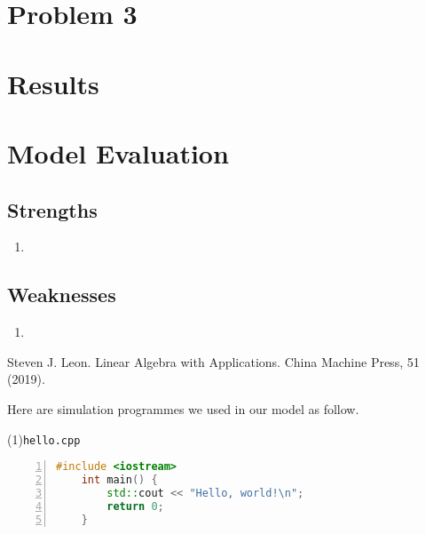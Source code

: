 \documentclass[UTF8]{mcmthesis}
\begin{document}
    \section{Problem 3}
    \section{Results}
    \section{Model Evaluation}
        \subsection{Strengths}
            \begin{enumerate}
                \item 
            \end{enumerate}
            
        \subsection{Weaknesses}
            \begin{enumerate}
                \item 
            \end{enumerate}


        \begin{thebibliography}{99}
            Steven J. Leon.
            Linear Algebra with Applications.
            China Machine Press, 51 (2019).
        \end{thebibliography}


    \begin{appendices}
        Here are simulation programmes we used in our model as follow.
        
        \vspace{.5em}
        \noindent(1)\quad \verb|hello.cpp|
        \vspace{.5em}
        \begin{lstlisting}[language = c++, numbers = left]
    #include <iostream>
    int main() {
        std::cout << "Hello, world!\n";
        return 0;
    }
        \end{lstlisting}

    \end{appendices}
\end{document}
